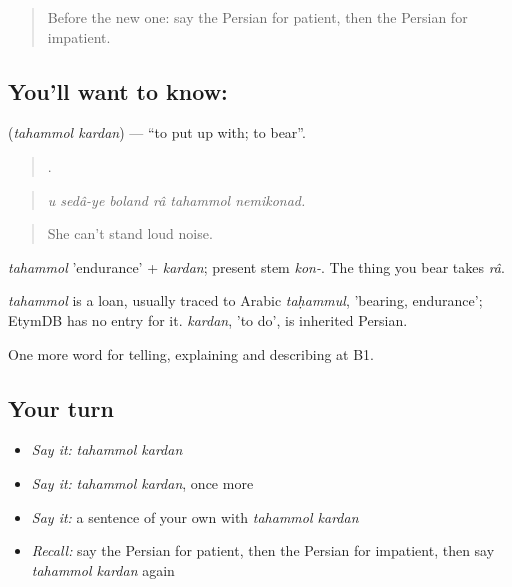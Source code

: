\begin{quote}
Before the new one: say the Persian for patient, then the Persian for impatient.
\end{quote}

\subsection*{You'll want to know:  }
\textbf{ } (\emph{tahammol kardan}) — \textquotedblleft{}to put up with; to bear\textquotedblright{}.

\begin{quote}
     .
\end{quote}

\begin{quote}
\emph{u sedâ-ye boland râ tahammol nemikonad.}
\end{quote}

\begin{quote}
She can't stand loud noise.
\end{quote}

\emph{tahammol} 'endurance' + \emph{kardan}; present stem \emph{kon-}. The thing you bear takes \emph{râ}.

\begin{cousinweb}
\emph{tahammol} is a loan, usually traced to Arabic \emph{taḥammul}, 'bearing, endurance'; EtymDB has no entry for it. \emph{kardan}, 'to do', is inherited Persian.
\end{cousinweb}

\begin{grammarlens}[title={What you've built}]
One more word for telling, explaining and describing at B1.
\end{grammarlens}

\subsection*{Your turn}
\begin{itemize}
\raggedright
  \item \emph{Say it:} \emph{tahammol kardan}
  \item \emph{Say it:} \emph{tahammol kardan}, once more
  \item \emph{Say it:} a sentence of your own with \emph{tahammol kardan}
  \item \emph{Recall:} say the Persian for patient, then the Persian for impatient, then say \emph{tahammol kardan} again
\end{itemize}

